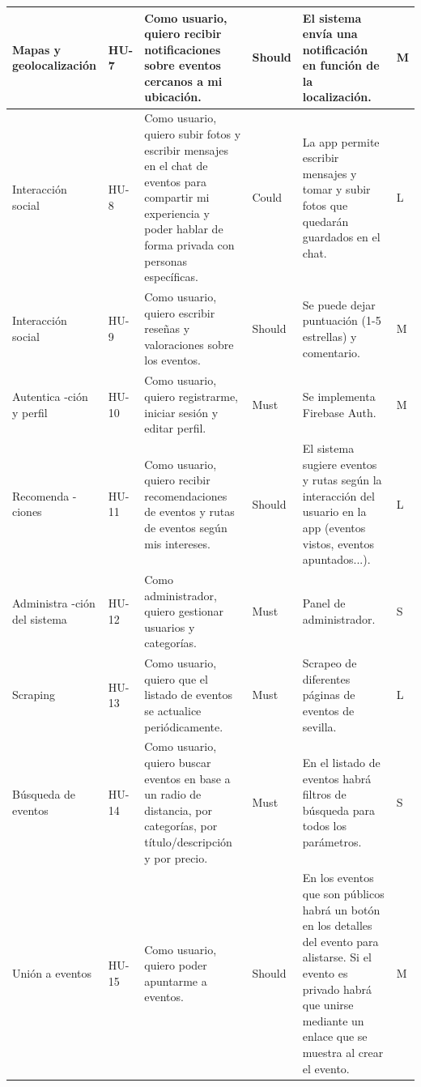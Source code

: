 \documentclass[12pt]{article}
\begin{document}
\begin{longtable}{|p{2.0cm}|p{1.0cm}|p{5cm}|p{2cm}|p{4cm}|p{1cm}|}
Mapas y geolocalización & HU-7 &
Como usuario, quiero recibir notificaciones sobre eventos cercanos a mi ubicación. &
Should &
El sistema envía una notificación en función de la localización. &
M \\
\hline

Interacción social & HU-8 &
Como usuario, quiero subir fotos y escribir mensajes en el chat de eventos para compartir mi experiencia y poder hablar de forma privada con personas específicas. &
Could &
La app permite escribir mensajes y tomar y subir fotos que quedarán guardados en el chat. &
L \\
\hline

Interacción social & HU-9 &
Como usuario, quiero escribir reseñas y valoraciones sobre los eventos. &
Should &
Se puede dejar puntuación (1-5 estrellas) y comentario. &
M \\
\hline

Autentica
-ción y perfil & HU-10 &
Como usuario, quiero registrarme, iniciar sesión y editar perfil. &
Must &
Se implementa Firebase Auth. &
M \\
\hline

Recomenda
-ciones & HU-11 &
Como usuario, quiero recibir recomendaciones de eventos y rutas de eventos según mis intereses. &
Should &
El sistema sugiere eventos y rutas según la interacción del usuario en la app (eventos vistos, eventos apuntados...). &
L \\
\hline

Administra
-ción del sistema & HU-12 &
Como administrador, quiero gestionar usuarios y categorías. &
Must &
Panel de administrador. &
S \\
\hline

Scraping & HU-13 &
Como usuario, quiero que el listado de eventos se actualice periódicamente. &
Must &
Scrapeo de diferentes páginas de eventos de sevilla. &
L \\
\hline

Búsqueda de eventos & HU-14 &
Como usuario, quiero buscar eventos en base a un radio de distancia, por categorías, por título/descripción y por precio. &
Must &
En el listado de eventos habrá filtros de búsqueda para todos los parámetros. &
S \\
\hline

Unión a eventos & HU-15 &
Como usuario, quiero poder apuntarme a eventos. &
Should &
En los eventos que son públicos habrá un botón en los detalles del evento para alistarse. Si el evento es privado habrá que unirse mediante un enlace que se muestra al crear el evento. &
M \\
\hline


\end{longtable}
\end{document}
